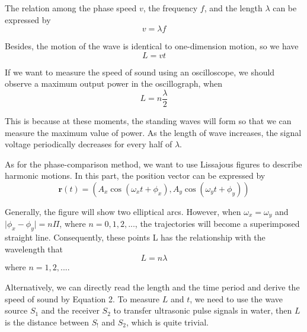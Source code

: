 \documentclass[a4paper]{report}
\begin{document}
	The relation among the phase speed $v$, the frequency $f$, and the length $\lambda$ can be expressed by
	\begin{equation}
	v=\lambda f
	\end{equation}
	
	Besides, the motion of the wave is identical to one-dimension motion, so we have
	\begin{equation}
	L=vt
	\end{equation}
	
	If we want to measure the speed of sound using an oscilloscope, we should observe a maximum output power in the oscillograph, when
	\begin{equation}
	L=n\dfrac{\lambda}{2}
	\end{equation}
	
	This is because at these moments, the standing waves will form so that we can measure the maximum value of power. As the length of wave increases, the signal voltage periodically decreases for every half of $\lambda$.
	
	As for the phase-comparison method, we want to use Lissajous figures to describe harmonic motions. In this part, the position vector can be expressed by
	\begin{equation}
	\bm{r}(t)=(A_x\cos(\omega_xt+\phi_x),A_y\cos(\omega_yt+\phi_y))
	\end{equation}
	
	Generally, the figure will show two elliptical arcs. However, when $\omega_x=\omega_y$ and $\vert\phi_x-\phi_y\vert=n\Pi$, where $n=0,1,2,...$, the trajectories will become a superimposed straight line. Consequently, these points L has the relationship with the wavelength that
	\begin{equation}
	L=n\lambda
	\end{equation}
	where $n=1,2,...$.
	
	Alternatively, we can directly read the length and the time period and derive the speed of sound by Equation 2. To measure $L$ and $t$, we need to use the wave source $S_1$ and the receiver $S_2$ to transfer ultrasonic pulse signals in water, then $L$ is the distance between $S_!$ and $S_2$, which is quite trivial.
\end{document}
